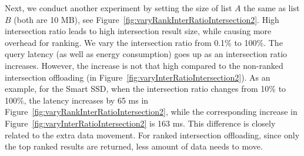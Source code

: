 Next, we conduct another experiment by setting the size of list $A$ the same as list $B$ (both are 10 MB), see Figure~\ref{fig:varyRankInterRatioIntersection2}. High intersection ratio leads to high intersection result size, while causing more overhead for ranking. We vary the intersection ratio from 0.1\% to 100\%.
The query latency (as well as energy consumption) goes up as an intersection ratio increases.
However, the increase is not that high compared to the non-ranked intersection offloading (in Figure~\ref{fig:varyInterRatioIntersection2}).
As an example, for the Smart SSD, when the intersection ratio changes from 10\% to 100\%, the latency increases by 65 ms in Figure~\ref{fig:varyRankInterRatioIntersection2}, while the corresponding increase in Figure~\ref{fig:varyInterRatioIntersection2} is 163 ms.
This difference is closely related to the extra data movement. For ranked intersection offloading, since only the top ranked results are returned, less amount of data needs to move.





